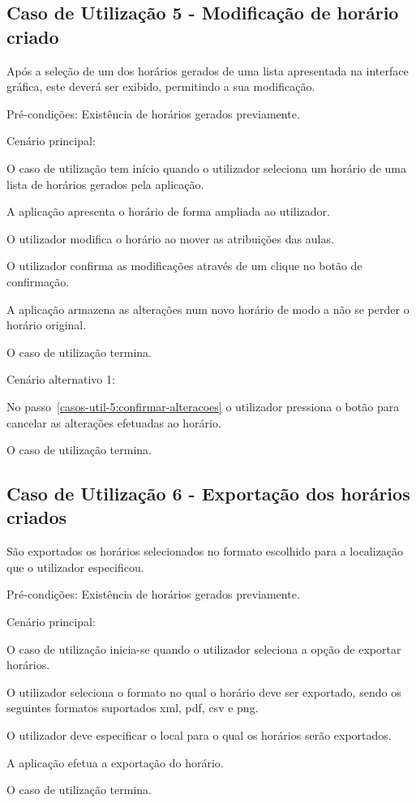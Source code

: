 \subsection*{Caso de Utilização 5 - Modificação de horário criado}
Após a seleção de um dos horários gerados de uma lista apresentada na interface gráfica, este deverá ser exibido, permitindo a sua modificação.

Pré-condições: Existência de horários gerados previamente.

Cenário principal:

\begin{compactenum}
    \item O caso de utilização tem início quando o utilizador seleciona um horário de uma lista de horários gerados pela aplicação.
    \item A aplicação apresenta o horário de forma ampliada ao utilizador.
    \item O utilizador modifica o horário ao mover as atribuições das aulas.
    \item O utilizador confirma as modificações através de um clique no botão de confirmação. \label{casos-util-5:confirmar-alteracoes}
    \item A aplicação armazena as alterações num novo horário de modo a não se perder o horário original.
    \item O caso de utilização termina.
\end{compactenum}

Cenário alternativo 1:

\begin{compactenum}
    \item No passo~\ref{casos-util-5:confirmar-alteracoes} o utilizador pressiona o botão para cancelar as alterações efetuadas ao horário.
    \item O caso de utilização termina.
\end{compactenum}

\subsection*{Caso de Utilização 6 - Exportação dos horários criados}
São exportados os horários selecionados no formato escolhido para a localização que o utilizador especificou.

Pré-condições: Existência de horários gerados previamente.

Cenário principal:

\begin{compactenum}
    \item O caso de utilização inicia-se quando o utilizador seleciona a opção de exportar horários.
    \item O utilizador seleciona o formato no qual o horário deve ser exportado, sendo os seguintes formatos suportados \gls{xml}, \gls{pdf}, \gls{csv} e \gls{png}.
    \item O utilizador deve especificar o local para o qual os horários serão exportados.
    \item A aplicação efetua a exportação do horário.
    \item O caso de utilização termina.
\end{compactenum}

